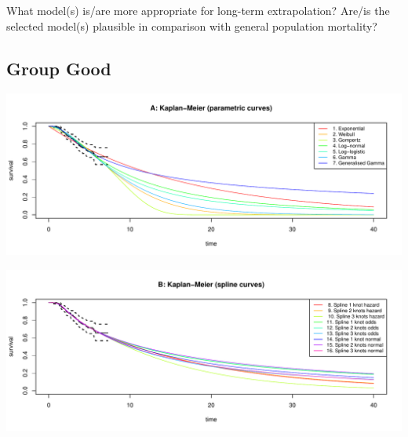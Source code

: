 \documentclass[]{article}
\begin{document}
What model(s) is/are more appropriate for long-term extrapolation?
Are/is the selected model(s) plausible in comparison with general
population mortality?

\subsection{Group Good}\label{group-good}

\begin{flushleft}\includegraphics[height=0.29\textheight]{Images/validate_extrapolation1-1} \end{flushleft}

\begin{flushleft}\includegraphics[height=0.29\textheight]{Images/validate_extrapolation1-2} \end{flushleft}
\end{document}
